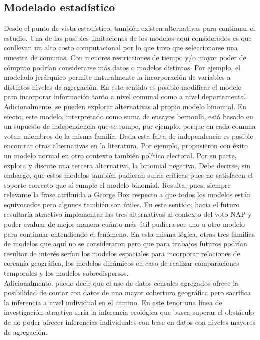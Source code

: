 \subsection*{Modelado estadístico}

Desde el punto de vista estadístico, también existen alternativas para continuar el estudio. Una de las posibles limitaciones de los modelos aquí considerados es que conllevan un alto costo computacional por lo que tuvo que seleccionarse una muestra de comunas. Con menores restricciones de tiempo y/o mayor poder de cómputo podrían considerarse más datos o modelos distintos. Por ejemplo, el modelado jerárquico permite naturalmente la incorporación de variables a distintos niveles de agregación. En este sentido es posible modificar el modelo para incorporar información tanto a nivel comunal como a nivel departamental.\\ 

Adicionalmente, se pueden explorar alternativas al propio modelo binomial. En efecto, este modelo, interpretado como suma de ensayos bernoulli, está basado en un supuesto de independencia que se rompe, por ejemplo, porque en cada comuna votan miembros de la misma familia. Dada esta falta de independencia es posible encontrar otras alternativas en la literatura. Por ejemplo, \textcite{MendozaNieto16} propusieron con éxito un modelo normal en otro contexto también político electoral. Por su parte, \textcite{Ortiz15} explora y discute una tercera alternativa, la binomial negativa. Debe decirse, sin embargo, que estos modelos también pudieran sufrir críticas pues no satisfacen el soporte correcto que sí cumple el modelo binomial. Resulta, pues, siempre relevante la frase atribuida a George Box respecto a que todos los modelos están equivocados pero algunos también son útiles. En este sentido, hacia el futuro resultaría atractivo implementar las tres alternativas al contexto del voto NAP y poder evaluar de mejor manera cuánto más útil pudiera ser uno u otro modelo para continuar entendiendo el fenómeno. En esta misma lógica, otras tres familias de modelos que aquí no se consideraron pero que para trabajos futuros podrían resultar de interés serían los modelos espaciales para incorporar relaciones de cercanía geográfica, los modelos dinámicos en caso de realizar comparaciones temporales y los modelos sobredispersos.\\

Adicionalmente, puedo decir que el uso de datos censales agregados ofrece la posibilidad de contar con datos de una mayor cobertura geográfica pero sacrifica la inferencia a nivel individual en el camino. En este tenor una línea de investigación atractiva sería la inferencia ecológica que busca superar el obstáculo de no poder ofrecer inferencias individuales con base en datos con niveles mayores de agregación.\\

